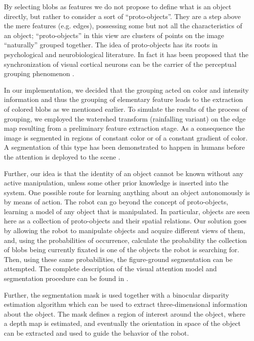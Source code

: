 By selecting blobs as features we do not propose to define what is an object directly, but rather to consider a sort of ``proto-objects''. They are a step above the mere features (e.g. edges), possessing some but not all the characteristics of an object; ``proto-objects'' in this view are clusters of points on the image ``naturally'' grouped together. The idea of proto-objects has its roots in psychological \cite{pylyshyn01indexes} and neurobiological literature. In fact it has been proposed that the synchronization of visual cortical neurons can be the carrier of the perceptual grouping phenomenon \cite{eckhorn88coherent,gray89oscillatory}.

In our implementation, we decided that the grouping acted on color and intensity information and thus the grouping of elementary feature leads to the extraction of colored blobs as we mentioned earlier. To simulate the results of the process of grouping, we employed the watershed transform (rainfalling variant) \cite{smet00rainfalling} on the edge map resulting from a preliminary feature extraction stage. As a consequence the image is segmented in regions of constant color or of a constant gradient of color. A segmentation of this type has been demonstrated to happen in humans before the attention is deployed to the scene \cite{driver00segmentation}.

Further, our idea is that the identity of an object cannot be known without any active manipulation, unless some other prior knowledge is inserted into the system. One possible route for learning anything about an object autonomously is by means of action. The robot can go beyond the concept of proto-objects, learning a model of any object that is manipulated. In particular, objects are seen here as a collection of proto-objects and their spatial relations. Our solution goes by allowing the robot to manipulate objects and acquire different views of them, and, using the probabilities of occurrence, calculate the probability the collection of blobs being currently fixated is one of the objects the robot is searching for. Then, using these same probabilities, the figure-ground segmentation can be attempted. The complete description of the visual attention model and segmentation procedure can be found in \cite{orabona05object}.

Further, the segmentation mask is used together with a binocular disparity estimation algorithm which can be used to extract three-dimensional information about the object. The mask defines a region of interest around the object, where a depth map is estimated, and eventually the orientation in space of the object can be extracted and used to guide the behavior of the robot.

